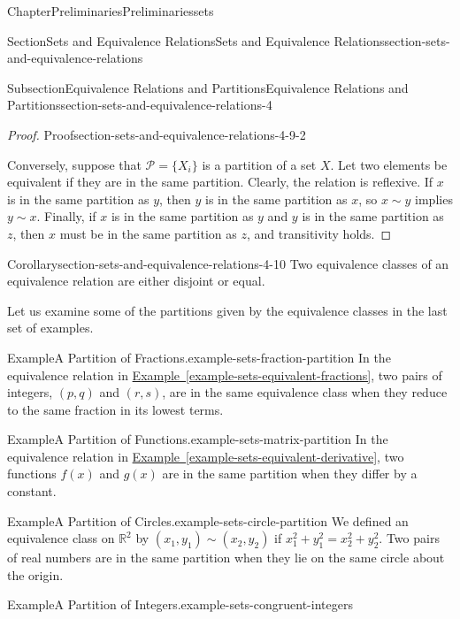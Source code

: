 \documentclass[oneside,10pt,]{book}
\newcommand{\xreffont}{\relax}
\numberwithin{equation}{section}
\begin{document}
\begin{chapterptx}{Chapter}{Preliminaries}{}{Preliminaries}{}{}{sets}
\begin{sectionptx}{Section}{Sets and Equivalence Relations}{}{Sets and Equivalence Relations}{}{}{section-sets-and-equivalence-relations}
\begin{subsectionptx}{Subsection}{Equivalence Relations and Partitions}{}{Equivalence Relations and Partitions}{}{}{section-sets-and-equivalence-relations-4}
\begin{proof}{Proof}{}{section-sets-and-equivalence-relations-4-9-2}
\par
Conversely, suppose that \({\mathcal P} = \{X_i\}\) is a partition of a set \(X\).  Let two elements be equivalent if they are in the same partition.  Clearly, the relation is reflexive.  If \(x\) is in the same partition as \(y\), then \(y\) is in the same partition as \(x\), so \(x \sim y\) implies \(y \sim x\).  Finally, if \(x\) is in the same partition as \(y\) and \(y\) is in the same partition as \(z\), then \(x\) must be in the same partition as \(z\), and transitivity holds.%
\end{proof}
\begin{corollary}{Corollary}{}{}{section-sets-and-equivalence-relations-4-10}%
Two equivalence classes of an equivalence relation are either disjoint or equal.%
\end{corollary}
Let us examine some of the partitions given by the equivalence classes in the last set of examples.%
\begin{example}{Example}{A Partition of Fractions.}{example-sets-fraction-partition}%
In the equivalence relation in \hyperref[example-sets-equivalent-fractions]{Example~{\xreffont\ref{example-sets-equivalent-fractions}}}, two pairs of integers, \((p,q)\) and \((r,s)\), are in the same equivalence class when they reduce to the same fraction in its lowest terms.%
\end{example}
\begin{example}{Example}{A Partition of Functions.}{example-sets-matrix-partition}%
In the equivalence relation in \hyperref[example-sets-equivalent-derivative]{Example~{\xreffont\ref{example-sets-equivalent-derivative}}}, two functions \(f(x)\) and \(g(x)\) are in the same partition when they differ by a constant.%
\end{example}
\begin{example}{Example}{A Partition of Circles.}{example-sets-circle-partition}%
We defined an equivalence class on \({\mathbb R}^2\) by \((x_1, y_1 ) \sim (x_2, y_2)\) if \(x_1^2 + y_1^2 = x_2^2 + y_2^2\).  Two pairs of real numbers are in the same partition when they lie on the same circle about the origin.%
\end{example}
\begin{example}{Example}{A Partition of Integers.}{example-sets-congruent-integers}%

\end{example}
\end{subsectionptx}
\end{sectionptx}
\end{chapterptx}
\end{document}
